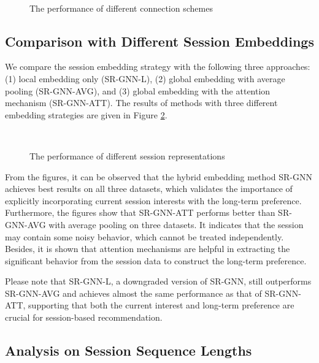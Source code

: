 \documentclass[letterpaper]{article} \usepackage{cite}
\begin{document}
\begin{figure}
	\centering
	\hfill
	\\
	\caption{The performance of different connection schemes}
	\label{fig:different-connection-schemes}
\end{figure}

\subsection{Comparison with Different Session Embeddings}

We compare the session embedding strategy with the following three approaches: (1) local embedding only (SR-GNN-L), (2) global embedding with average pooling (SR-GNN-AVG), and (3) global embedding with the attention mechanism (SR-GNN-ATT). The results of methods with three different embedding strategies are given in Figure \ref{fig:different-session-representations}.

\begin{figure}
	\centering
	\hfill
	\\
	\caption{The performance of different session representations}
	\label{fig:different-session-representations}
\end{figure}

From the figures, it can be observed that the hybrid embedding method SR-GNN achieves best results on all three datasets, which validates the importance of explicitly incorporating current session interests with the long-term preference. Furthermore, the figures show that SR-GNN-ATT performs better than SR-GNN-AVG with average pooling on three datasets. It indicates that the session may contain some noisy behavior, which cannot be treated independently. Besides, it is shown that attention mechanisms are helpful in extracting the significant behavior from the session data to construct the long-term preference.

Please note that SR-GNN-L, a downgraded version of SR-GNN, still outperforms SR-GNN-AVG and achieves almost the same performance as that of SR-GNN-ATT, supporting that both the current interest and long-term preference are crucial for session-based recommendation.

\subsection{Analysis on Session Sequence Lengths}
\end{document}
